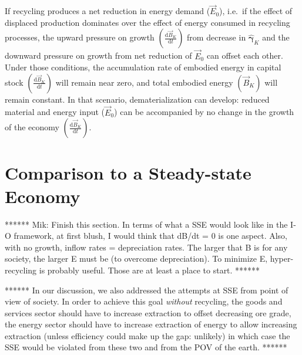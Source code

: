 If recycling produces a net reduction in energy demand ($\vec{E}_{0}$), 
i.e.\ if the effect of displaced production dominates over the effect 
of energy consumed in recycling processes, 
the upward pressure on growth $\left(\frac{\mathrm{d}\vec{B}_{K}}{\mathrm{d}t}\right)$ 
from decrease in $\hat{\bm{\gamma}}_{K}$ and 
the downward pressure on growth from net reduction of $\vec{E}_{0}$ 
can offset each other.
Under those conditions, 
the accumulation rate of embodied energy in capital stock
$\left(\frac{\mathrm{d}\vec{B}_{K}}{\mathrm{d}t}\right)$ 
will remain near zero, 
and total embodied energy $(\vec{B}_{K})$ will remain constant. 
In that scenario, dematerialization can develop: 
reduced material and energy input ($\vec{E}_{0}$) can be accompanied by 
no change in
the growth of the economy
$\left(\frac{\mathrm{d}\vec{B}_{K}}{\mathrm{d}t}\right)$.


\section{Comparison to a Steady-state Economy}

****** Mik: Finish this section. 
In terms of what a SSE would look like in the I-O framework, 
at first blush, I would think that dB/dt = 0 is one aspect.  
Also, with no growth, inflow rates = depreciation rates.  
The larger that B is for any society, the larger E must be (to overcome depreciation).  
To minimize E, hyper-recycling is probably useful.  
Those are at least a place to start. ******

****** In our discussion, 
we also addressed the attempts at SSE from point of view of society. 
In order to achieve this goal \emph{without} recycling, 
the goods and services sector should have to increase extraction to offset decreasing ore grade, 
the energy sector should have to increase extraction of energy 
to allow increasing extraction (unless efficiency could make up the gap: unlikely) 
in which case the SSE would be violated from these two and from the POV of the earth.
******







